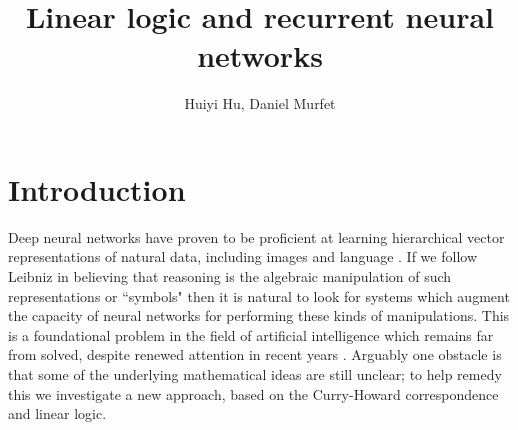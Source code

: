 \documentclass[english,letter paper,12pt,leqno]{article}
\theoremstyle{example}
\numberwithin{equation}{section}
\def\res{\operatorname{Res}}
\begin{document}
\def\Res{\res\!}
\newcommand{\ud}{\mathrm{d}}
\newcommand{\Ress}[1]{\res_{#1}\!}
\newcommand{\cat}[1]{\mathcal{#1}}
\newcommand{\lto}{\longrightarrow}
\newcommand{\xlto}[1]{\stackrel{#1}\lto}
\newcommand{\mf}[1]{\mathfrak{#1}}
\newcommand{\md}[1]{\mathscr{#1}}
\def\sus{\l}
\def\l{\,|\,}
\def\sgn{\textup{sgn}}
\newcommand{\den}[1]{\llbracket #1 \rrbracket}
\def\inta{\textbf{int}}
\def\binta{\textbf{bint}}
\def\boola{\textbf{bool}}
\def\comp{\underline{\textup{comp}}}
\def\mult{\underline{\textup{mult}}}
\def\repeat{\underline{\textup{repeat}}}
\def\master{\underline{\textup{master}}}
\def\feed{\underline{\textup{feed}}}

\DeclarePairedDelimiter\bra{\langle}{\rvert}
\DeclarePairedDelimiter\ket{\lvert}{\rangle}

\title{Linear logic and recurrent neural networks}
\author{Huiyi Hu, Daniel Murfet}

\maketitle

\tableofcontents

\section{Introduction}

Deep neural networks have proven to be proficient at learning hierarchical vector representations of natural data, including images and language \cite{dlnature}. If we follow Leibniz \cite{frege} in believing that reasoning is the algebraic manipulation of such representations or ``symbols" then it is natural to look for systems which augment the capacity of neural networks for performing these kinds of manipulations. This is a foundational problem in the field of artificial intelligence which remains far from solved, despite renewed attention in recent years \cite{ntm, joulin, dnc, graves_etal, grefen, weston, tarlow, freitas, neuralprog}. Arguably one obstacle is that some of the underlying mathematical ideas are still unclear; to help remedy this we investigate a new approach, based on the Curry-Howard correspondence and linear logic.
\end{document}
